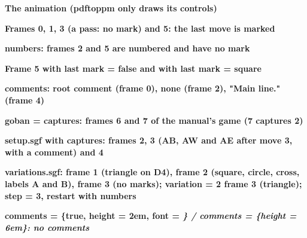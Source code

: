 \documentclass{article}
\newcommand\case[1]{\par\medskip\noindent\textbf{#1}\par\nopagebreak}
\begin{document}

\case{The animation (pdftoppm only draws its controls)}

\case{Frames 0, 1, 3 (a pass: no mark) and 5: the last move is marked}

\case{numbers: frames 2 and 5 are numbered and have no mark}

\case{Frame 5 with last mark = false and with last mark = {square}}

\case{comments: root comment (frame 0), none (frame 2), "Main line." (frame 4)}

\case{goban = {captures}: frames 6 and 7 of the manual's game (7 captures 2)}


\case{setup.sgf with captures: frames 2, 3 (AB, AW and AE after move 3, with a comment) and 4}

\case{variations.sgf: frame 1 (triangle on D4), frame 2 (square, circle, cross, labels A and B), frame 3 (no marks); variation = 2 frame 3 (triangle); step = 3, restart with numbers}

\case{comments = \{true, height = 2em, font = \string\itshape\} / comments = \{height = 6em\}: no comments}
\end{document}
